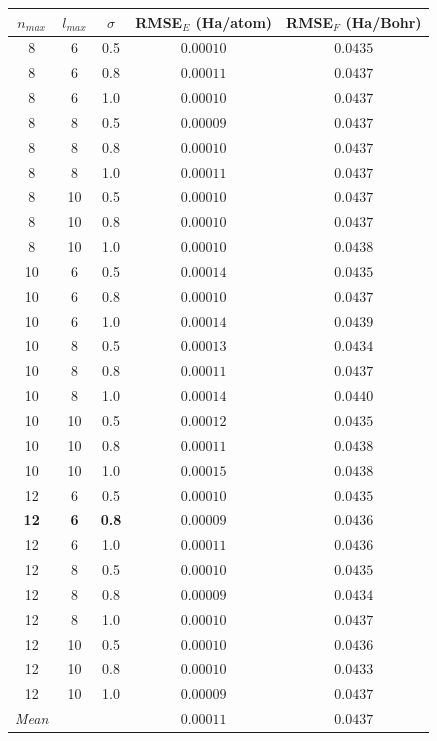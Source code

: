 \begin{tabular}{ccccc}
\toprule
$n_{max}$ & $l_{max}$ & $\sigma$ & RMSE$_E$ (Ha/atom) & RMSE$_F$ (Ha/Bohr) \\
\midrule
8 & 6 & 0.5 & $0.00010$ & $0.0435$ \\
8 & 6 & 0.8 & $0.00011$ & $0.0437$ \\
8 & 6 & 1.0 & $0.00010$ & $0.0437$ \\
8 & 8 & 0.5 & $0.00009$ & $0.0437$ \\
8 & 8 & 0.8 & $0.00010$ & $0.0437$ \\
8 & 8 & 1.0 & $0.00011$ & $0.0437$ \\
8 & 10 & 0.5 & $0.00010$ & $0.0437$ \\
8 & 10 & 0.8 & $0.00010$ & $0.0437$ \\
8 & 10 & 1.0 & $0.00010$ & $0.0438$ \\
10 & 6 & 0.5 & $0.00014$ & $0.0435$ \\
10 & 6 & 0.8 & $0.00010$ & $0.0437$ \\
10 & 6 & 1.0 & $0.00014$ & $0.0439$ \\
10 & 8 & 0.5 & $0.00013$ & $0.0434$ \\
10 & 8 & 0.8 & $0.00011$ & $0.0437$ \\
10 & 8 & 1.0 & $0.00014$ & $0.0440$ \\
10 & 10 & 0.5 & $0.00012$ & $0.0435$ \\
10 & 10 & 0.8 & $0.00011$ & $0.0438$ \\
10 & 10 & 1.0 & $0.00015$ & $0.0438$ \\
12 & 6 & 0.5 & $0.00010$ & $0.0435$ \\
\textbf{12} & \textbf{6} & \textbf{0.8} & \textbf{$0.00009$} & \textbf{$0.0436$} \\
12 & 6 & 1.0 & $0.00011$ & $0.0436$ \\
12 & 8 & 0.5 & $0.00010$ & $0.0435$ \\
12 & 8 & 0.8 & $0.00009$ & $0.0434$ \\
12 & 8 & 1.0 & $0.00010$ & $0.0437$ \\
12 & 10 & 0.5 & $0.00010$ & $0.0436$ \\
12 & 10 & 0.8 & $0.00010$ & $0.0433$ \\
12 & 10 & 1.0 & $0.00009$ & $0.0437$ \\
\midrule
\textit{Mean} & & & \textit{$0.00011$} & \textit{$0.0437$} \\
\bottomrule
\end{tabular}

